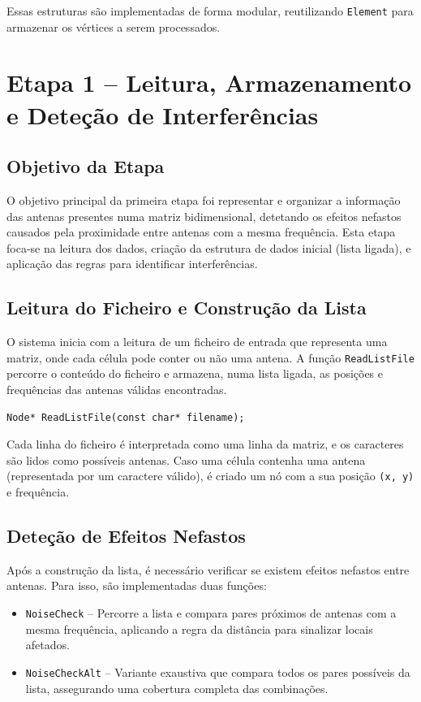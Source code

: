 \documentclass[a4paper,12pt]{article}
\begin{document}
Essas estruturas são implementadas de forma modular, reutilizando \texttt{Element} para armazenar os vértices a serem processados.

\newpage

\section{Etapa 1 – Leitura, Armazenamento e Deteção de Interferências}

\subsection{Objetivo da Etapa}
O objetivo principal da primeira etapa foi representar e organizar a informação das antenas presentes numa matriz bidimensional, detetando os efeitos nefastos causados pela proximidade entre antenas com a mesma frequência. Esta etapa foca-se na leitura dos dados, criação da estrutura de dados inicial (lista ligada), e aplicação das regras para identificar interferências.

\subsection{Leitura do Ficheiro e Construção da Lista}
O sistema inicia com a leitura de um ficheiro de entrada que representa uma matriz, onde cada célula pode conter ou não uma antena. A função \texttt{ReadListFile} percorre o conteúdo do ficheiro e armazena, numa lista ligada, as posições e frequências das antenas válidas encontradas.

\begin{lstlisting}[style=CStyle]
Node* ReadListFile(const char* filename);
\end{lstlisting}

Cada linha do ficheiro é interpretada como uma linha da matriz, e os caracteres são lidos como possíveis antenas. Caso uma célula contenha uma antena (representada por um caractere válido), é criado um nó com a sua posição \texttt{(x, y)} e frequência.

\subsection{Deteção de Efeitos Nefastos}
Após a construção da lista, é necessário verificar se existem efeitos nefastos entre antenas. Para isso, são implementadas duas funções:

\begin{itemize}
    \item \texttt{NoiseCheck} – Percorre a lista e compara pares próximos de antenas com a mesma frequência, aplicando a regra da distância para sinalizar locais afetados.
    \item \texttt{NoiseCheckAlt} – Variante exaustiva que compara todos os pares possíveis da lista, assegurando uma cobertura completa das combinações.
\end{itemize}
\end{document}

